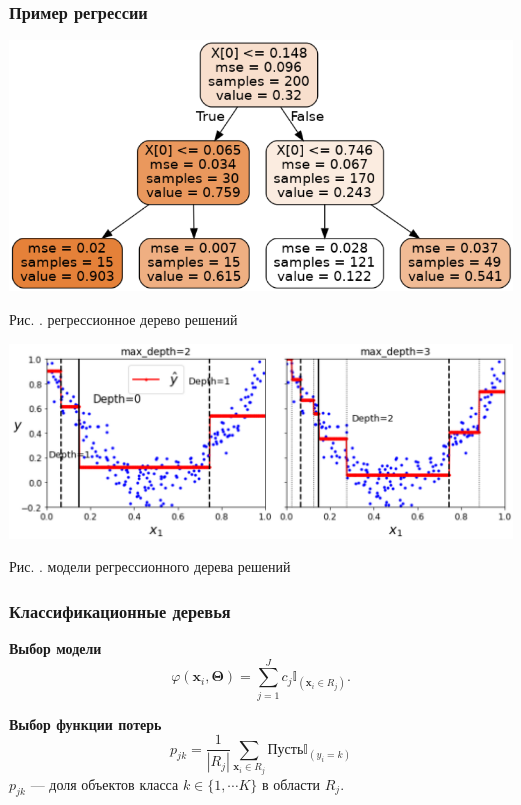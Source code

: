 \documentclass[pdf, 9pt, usenames, dvipsnames, unicode, hyperref={bookmarks=true,bookmarksopen=false, bookmarksnumbered}]{beamer}
\begin{document}
\begin{frame}\frametitle{Пример регрессии}

    \begin{center}
    \includegraphics[scale=0.3]{pic101.png}{ \\ }
    \end{center}
    
    \begin{center}
	Рис. . регрессионное дерево решений
    \end{center}
    
    \begin{center}
    \includegraphics[scale=0.3]{pic102.png}{ \\ }
    \end{center}
    
    \begin{center}
	Рис. . модели регрессионного дерева решений
    \end{center}


\end{frame}


\begin{frame}\frametitle{Классификационные деревья}

\textbf{Выбор модели}\\

	$$\varphi(\textbf{x}_i, \bm{\Theta}) = \sum\limits_{j=1}^{J} c_j \mathbb{I}_{(\textbf{x}_i \in R_j)}.$$

\textbf{Выбор функции потерь}\\

	$${p}_{jk} = \dfrac{1}{|R_j|} \sum\limits_{\textbf{x}_i \in R_j} Пусть \mathbb{I}_{(y_i = k)}$$ 
	${p}_{jk}$ --- доля объектов класса $k \in \{ 1, \cdots K \} $ в области $R_j$.\\

\end{frame}
\end{document}
